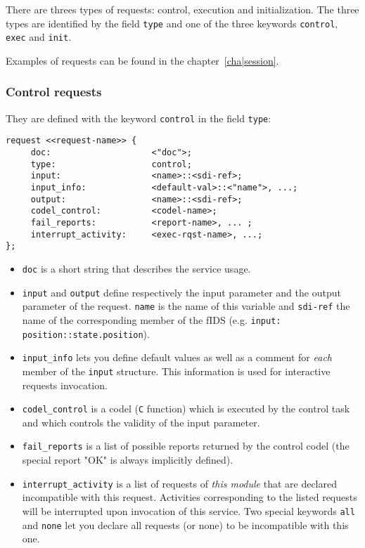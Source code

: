 There     are  threes   types of      requests:  control, execution   and
initialization. The three types are  identified  by the field \texttt{type}
and one of the three keywords \texttt{control}, \texttt{exec} and \texttt{init}.

Examples of requests can be found in the chapter~\ref{cha|session}.

\subsubsection{Control requests}

They are defined with the keyword \texttt{control} in the field \texttt{type}:

\begin{center}\begin{cartouche}\small\begin{verbatim}
request <<request-name>> {
     doc:                    <"doc">;
     type:                   control;
     input:                  <name>::<sdi-ref>;
     input_info:             <default-val>::<"name">, ...;
     output:                 <name>::<sdi-ref>;
     codel_control:          <codel-name>;
     fail_reports:           <report-name>, ... ;
     interrupt_activity:     <exec-rqst-name>, ...;
};
\end{verbatim}\end{cartouche}\end{center}

\begin{itemize}
\item \texttt{doc} is a short string that describes the service usage.

\item \texttt{input} and \texttt{output} define respectively the input
parameter and the output parameter of the request. \texttt{name} is the name
of this variable and  \texttt{sdi-ref} the name  of the corresponding member
of the fIDS (e.g. \texttt{input: position::state.position}).

\item \texttt{input\_info} lets you define default values as well as a
comment for \emph{each}   member  of  the  \texttt{input}  structure.  This
information is used for interactive  requests invocation.

\item \texttt{codel\_control} is a codel (\texttt{C} function) which is
executed by the control task and which controls the validity of the input
parameter.

\item \texttt{fail\_reports} is a list of possible reports returned by the
control codel (the special report "OK" is always implicitly defined).

\item \texttt{interrupt\_activity} is a list of requests of \emph{this module}
that   are    declared   incompatible  with     this request.  Activities
corresponding to the listed requests will  be interrupted upon invocation
of this service.  Two special keywords \texttt{all} and \texttt{none} let  you
declare all requests (or none) to be incompatible with this one.
\end{itemize}


